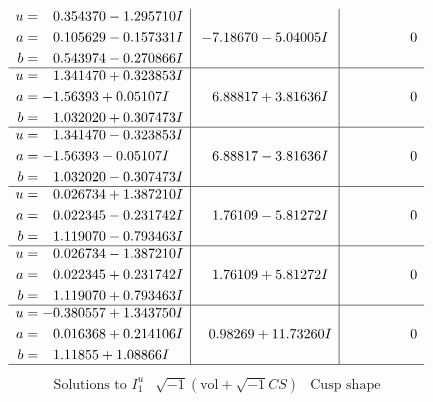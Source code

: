 \documentclass[1p]{elsarticle_modified}
\theoremstyle{definition}
\newcommand{\I}{\sqrt{-1}}
\begin{document}
$$\begin{array}{c|c|c}
\begin{aligned}
u &= \phantom{-}0.354370 - 1.295710 I \\
a &= \phantom{-}0.105629 - 0.157331 I \\
b &= \phantom{-}0.543974 - 0.270866 I\end{aligned}
 & -7.18670 - 5.04005 I & \phantom{-0.000000 } 0 \\ \hline\begin{aligned}
u &= \phantom{-}1.341470 + 0.323853 I \\
a &= -1.56393 + 0.05107 I \\
b &= \phantom{-}1.032020 + 0.307473 I\end{aligned}
 & \phantom{-}6.88817 + 3.81636 I & \phantom{-0.000000 } 0 \\ \hline\begin{aligned}
u &= \phantom{-}1.341470 - 0.323853 I \\
a &= -1.56393 - 0.05107 I \\
b &= \phantom{-}1.032020 - 0.307473 I\end{aligned}
 & \phantom{-}6.88817 - 3.81636 I & \phantom{-0.000000 } 0 \\ \hline\begin{aligned}
u &= \phantom{-}0.026734 + 1.387210 I \\
a &= \phantom{-}0.022345 - 0.231742 I \\
b &= \phantom{-}1.119070 - 0.793463 I\end{aligned}
 & \phantom{-}1.76109 - 5.81272 I & \phantom{-0.000000 } 0 \\ \hline\begin{aligned}
u &= \phantom{-}0.026734 - 1.387210 I \\
a &= \phantom{-}0.022345 + 0.231742 I \\
b &= \phantom{-}1.119070 + 0.793463 I\end{aligned}
 & \phantom{-}1.76109 + 5.81272 I & \phantom{-0.000000 } 0 \\ \hline\begin{aligned}
u &= -0.380557 + 1.343750 I \\
a &= \phantom{-}0.016368 + 0.214106 I \\
b &= \phantom{-}1.11855 + 1.08866 I\end{aligned}
 & \phantom{-}0.98269 + 11.73260 I & \phantom{-0.000000 } 0\\
 \hline 
 \end{array}$$\newpage$$\begin{array}{c|c|c}  
\text{Solutions to }I^u_{1}& \I (\text{vol} + \sqrt{-1}CS) & \text{Cusp shape}\\

\end{array}$$
\end{document}
